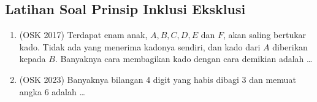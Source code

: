 \subsection{Latihan Soal Prinsip Inklusi Eksklusi}
\begin{enumerate}
    \item (OSK 2017) Terdapat enam anak, $A, B, C, D, E$ dan $F$, akan saling bertukar kado. Tidak ada yang menerima kadonya sendiri, dan kado dari $A$ diberikan kepada $B$. Banyaknya cara membagikan kado dengan cara demikian adalah \dots

    \item (OSK 2023) Banyaknya bilangan 4 digit yang habis dibagi 3 dan memuat angka 6 adalah \ldots
\end{enumerate}